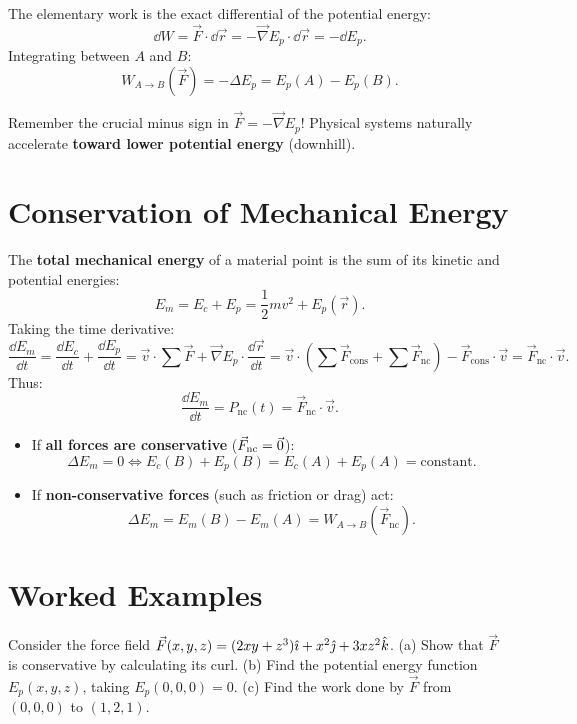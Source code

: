 The elementary work is the exact differential of the potential energy:
\[
\dd W = \vec{F}\cdot\dd\vec{r} = -\vec{\nabla} E_p\cdot\dd\vec{r} = -\dd E_p.
\]
Integrating between $A$ and $B$:
\[
\boxed{W_{A\to B}(\vec{F}) = -\Delta E_p = E_p(A) - E_p(B).}
\]
\begin{warning}
Remember the crucial minus sign in $\vec{F} = -\vec{\nabla} E_p$! Physical systems naturally accelerate \textbf{toward lower potential energy} (downhill).
\end{warning}

\section{Conservation of Mechanical Energy}

The \textbf{total mechanical energy} of a material point is the sum of its kinetic and potential energies:
\[
\boxed{E_m = E_c + E_p = \frac{1}{2}m v^2 + E_p(\vec{r}).}
\]
Taking the time derivative:
\[
\frac{\dd E_m}{\dd t} = \frac{\dd E_c}{\dd t} + \frac{\dd E_p}{\dd t} = \vec{v}\cdot\sum\vec{F} + \vec{\nabla} E_p\cdot\frac{\dd\vec{r}}{\dd t} = \vec{v}\cdot\left(\sum\vec{F}_{\text{cons}} + \sum\vec{F}_{\text{nc}}\right) - \vec{F}_{\text{cons}}\cdot\vec{v} = \vec{F}_{\text{nc}}\cdot\vec{v}.
\]
Thus:
\[
\boxed{\frac{\dd E_m}{\dd t} = P_{\text{nc}}(t) = \vec{F}_{\text{nc}}\cdot\vec{v}.}
\]
\begin{itemize}[leftmargin=1.4em,itemsep=2pt]
  \item If \textbf{all forces are conservative} ($\vec{F}_{\text{nc}} = \vec{0}$):
        \[
        \boxed{\Delta E_m = 0 \iff E_c(B) + E_p(B) = E_c(A) + E_p(A) = \text{constant}.}
        \]
  \item If \textbf{non-conservative forces} (such as friction or drag) act:
        \[
        \boxed{\Delta E_m = E_m(B) - E_m(A) = W_{A\to B}\left(\vec{F}_{\text{nc}}\right).}
        \]
\end{itemize}

\section{Worked Examples}

\begin{worked}
Consider the force field $\vec{F}(x, y, z) = (2xy + z^3)\hat{\imath} + x^2\hat{\jmath} + 3xz^2\hat{k}$.
(a) Show that $\vec{F}$ is conservative by calculating its curl.
(b) Find the potential energy function $E_p(x, y, z)$, taking $E_p(0, 0, 0) = 0$.
(c) Find the work done by $\vec{F}$ from $(0, 0, 0)$ to $(1, 2, 1)$.
\end{worked}

